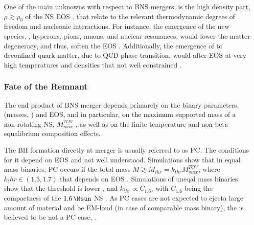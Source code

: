 One of the main unknowns with respect to \ac{BNS} mergers, is the high density part, 
$\rho{\gtrsim}\rho_0$ of the \ac{NS} \ac{EOS} \citep[\eg][]{Hebeler:2013nza,Oertel:2016bki}, that relate to the 
relevant thermodynamic degrees of freedom and nucleonic interactions. For instance, 
the emergence of the new species, \eg, hyperons, pions, muons, and nuclear 
resonances, would lower the matter degeneracy, and thus, soften the \ac{EOS} \citep[\eg][]{Fore:2019wib,Vidana:2010ip}.
Additionally, the emergence of to deconfined quark matter, due to \ac{QCD} phase transition,
would alter \ac{EOS} at very high temperatures and densities that not well constrained 
\cite{Busza:2018rrf}.


\subsubsection{Fate of the Remnant}

The end product of \ac{BNS} merger depends primarely on the binary parameters, (masses, 
\mr{}) and \ac{EOS}, and in particular, on the maximum supported mass of a non-rotating 
\ac{NS}, $M_{max}^{TOV}$ \cite{Shibata:2016}, as well as on the finite temperature and 
non-beta-equalibrium composition effects. 

The \ac{BH} formation directly at merger is usually referred to as \ac{PC}. 
The conditions for it depend on \ac{EOS} and not well understood. 
Simulations show that in equal mass binaries, \ac{PC} occurs if the total mass 
$M\gtrsim M_{thr} = k_{thr}M_{max}^{TOV}$, where $k_thr\in(1.3,1.7)$ that depends on 
\ac{EOS} \cite{Shibata:2005ss,Shibata:2006nm,Hotokezaka:2011dh,Bauswein:2013jpa}.
Simulations of uneqal mass binaries show that the threshold is lower \cite{Bauswein:2017vtn}, and 
$k_{thr}\propto C_{1.6}$, with $C_{1.6}$ being the compactness of the $1.6\,\Msun$ 
\ac{NS} \cite{Hotokezaka:2011dh,Bauswein:2013jpa,Bauswein:2017vtn}. As \ac{PC} cases are not expected to ejecta large 
amount of material and be \ac{EM}-loud (in case of comparable mass binary), the \GW{} 
is believed to be not a \ac{PC} case, \cite{Margalit:2017dij,Bauswein:2017vtn}. 

